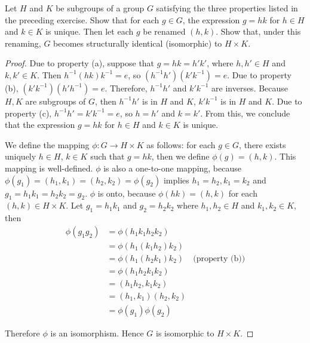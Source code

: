 \begin{exercise}
    Let $H$ and $K$ be subgroups of a group $G$ satisfying the three properties listed in the preceding exercise. Show that for each $g\in G$, the expression $g = hk$ for $h\in H$ and $k\in K$ is unique. Then let each $g$ be renamed $(h, k)$. Show that, under this renaming, $G$ becomes structurally identical (isomorphic) to $H\times K$.
\end{exercise}

\begin{proof}
    Due to property (a), suppose that $g = hk = h'k'$, where $h, h'\in H$ and $k, k'\in K$. Then $h^{-1}(hk)k^{-1} = e$, so $(h^{-1}h')(k'k^{-1}) = e$. Due to property (b), $(k'k^{-1})(h'h^{-1}) = e$. Therefore, $h^{-1}h'$ and $k'k^{-1}$ are inverses. Because $H, K$ are subgroups of $G$, then $h^{-1}h'$ is in $H$ and $K$, $k'k^{-1}$ is in $H$ and $K$. Due to property (c), $h^{-1}h' = k'k^{-1} = e$, so $h = h'$ and $k = k'$. From this, we conclude that the expression $g = hk$ for $h\in H$ and $k\in K$ is unique.

    We define the mapping $\phi: G\to H\times K$ as follows: for each $g\in G$, there exists uniquely $h\in H$, $k\in K$ such that $g = hk$, then we define $\phi(g) = (h, k)$. This mapping is well-defined. $\phi$ is also a one-to-one mapping, because $\phi(g_{1}) = (h_{1},k_{1}) = (h_{2},k_{2}) = \phi(g_{2})$ implies $h_{1} = h_{2}, k_{1} = k_{2}$ and $g_{1} = h_{1}k_{1} = h_{2}k_{2} = g_{2}$. $\phi$ is onto, because $\phi(hk) = (h,k)$ for each $(h,k)\in H\times K$. Let $g_{1} = h_{1}k_{1}$ and $g_{2} = h_{2}k_{2}$ where $h_{1}, h_{2}\in H$ and $k_{1}, k_{2}\in K$, then
    \begin{align*}
        \phi(g_{1}g_{2}) & = \phi(h_{1}k_{1}h_{2}k_{2})                           \\
                         & = \phi(h_{1}(k_{1}h_{2})k_{2})                         \\
                         & = \phi(h_{1}(h_{2}k_{1})k_{2}) & \text{(property (b))} \\
                         & = \phi(h_{1}h_{2} k_{1}k_{2})                          \\
                         & = (h_{1}h_{2}, k_{1}k_{2})                             \\
                         & = (h_{1}, k_{1})(h_{2}, k_{2})                         \\
                         & = \phi(g_{1})\phi(g_{2})
    \end{align*}

    Therefore $\phi$ is an isomorphism. Hence $G$ is isomorphic to $H\times K$.
\end{proof}

